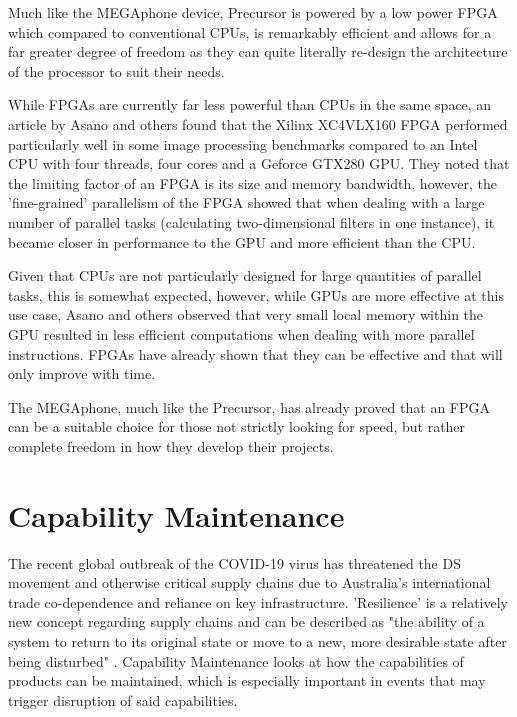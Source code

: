 Much like the MEGAphone device, Precursor is powered by a low power FPGA which compared to conventional CPUs, is remarkably efficient and allows for a far greater degree of freedom as they can quite literally re-design the architecture of the processor to suit their needs.

While FPGAs are currently far less powerful than CPUs in the same space, an article by Asano and others \cite{fpga} found that the Xilinx XC4VLX160 FPGA performed particularly well in some image processing benchmarks compared to an Intel CPU with four threads, four cores and a Geforce GTX280 GPU.
They noted that the limiting factor of an FPGA is its size and memory bandwidth, however, the 'fine-grained' parallelism of the FPGA showed that when dealing with a large number of parallel tasks (calculating two-dimensional filters in one instance), it became closer in performance to the GPU and more efficient than the CPU.

Given that CPUs are not particularly designed for large quantities of parallel tasks, this is somewhat expected, however, while GPUs are more effective at this use case, Asano and others observed that very small local memory within the GPU resulted in less efficient computations when dealing with more parallel instructions.
FPGAs have already shown that they can be effective and that will only improve with time.

The MEGAphone, much like the Precursor, has already proved that an FPGA can be a suitable choice for those not strictly looking for speed, but rather complete freedom in how they develop their projects.

\section{Capability Maintenance}
The recent global outbreak of the COVID-19 virus has threatened the DS movement and otherwise critical supply chains due to Australia's international trade co-dependence and reliance on key infrastructure.
'Resilience' is a relatively new concept regarding supply chains and can be described as "the ability of a system to return to its original state or move to a new, more desirable state after being disturbed" \cite{supply}.
Capability Maintenance looks at how the capabilities of products can be maintained, which is especially important in events that may trigger disruption of said capabilities.

